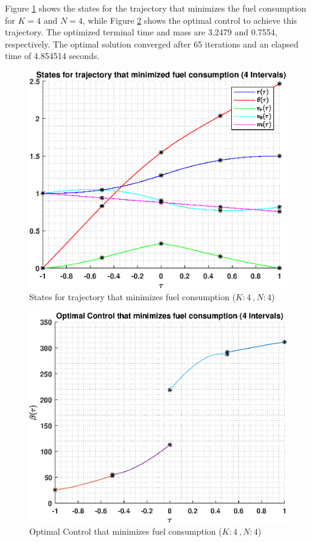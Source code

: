 \documentclass[]{article}
\begin{document}
Figure \ref{fig:directStatesK4Poly4} shows the states for the trajectory that minimizes the fuel consumption for \(K = 4\) and  \(N = 4\), while Figure \ref{fig:directControlK4Poly4} shows the optimal control to achieve this trajectory. The optimized terminal time and mass are 3.2479 and 0.7554, respectively. The optimal solution converged after 65 iterations and an elapsed time of 4.854514 seconds.
\begin{figure}
	\centering
	\includegraphics[scale=0.75]{directStatesK4Poly4.eps}
	\caption{States for trajectory that minimizes fuel consumption (\(K:4\ , N:4\))}
	\label{fig:directStatesK4Poly4}
\end{figure}
\begin{figure}
	\centering
	\includegraphics[scale=0.75]{directControlK4Poly4.eps}
	\caption{Optimal Control that minimizes fuel consumption (\(K:4\ , N:4\))}
	\label{fig:directControlK4Poly4}
\end{figure}
\FloatBarrier
\end{document}
